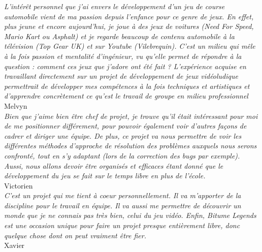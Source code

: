 \documentclass[11pt,a4paper]{article}
\begin{document}
  \textit{L'intérêt personnel que j'ai envers le développement d'un jeu de course automobile vient de ma 
    passion depuis l'enfance pour ce genre de jeux. En effet, plus jeune et encore aujourd'hui, je joue
    à des jeux de voitures (Need For Speed, Mario Kart ou Asphalt) et je regarde beaucoup de contenu automobile
    à la télévision (Top Gear UK) et sur Youtube (Vilebrequin). C'est un milieu qui mêle à la fois passion et 
    mentalité d'ingénieur, vu qu'elle permet de répondre à la question : comment ces jeux que j'adore ont été 
    fait ? L'expérience acquise en travaillant directement sur un projet de développement de jeux vidéoludique 
    permettrait de développer mes compétences à la fois techniques et artistiques et d'apprendre concrètement 
    ce qu'est le travail de groupe en milieu professionnel} \\
  \indent Melvyn\\

  \textit{Bien que j'aime bien être chef de projet, je trouve qu'il était intéressant 
    pour moi de me positionner différement, pour pouvoir également voir d'autres façons 
    de cadrer et diriger une équipe. De plus, ce projet va nous permettre de voir les différentes
    méthodes d'approche de résolution des problèmes auxquels nous serons confronté, tout en s'y
    adaptant (lors de la correction des bugs par exemple). Aussi, nous allons devoir être organisés
    et efficaces étant donné que le développement du jeu se fait sur le temps libre en plus de l'école.} \\
  \indent Victorien\\

  \textit{C'est un projet qui me tient à coeur personnellement. Il va m'apporter de la discipline pour le travail
    en équipe. Il va aussi me permettre de découvrir un monde que je ne connais pas très bien, celui du jeu vidéo.
    Enfin, Bitume Legends est une occasion unique pour faire un projet presque entièrement libre, donc quelque
    chose dont on peut vraiment être fier.}\\
  \indent Xavier
\clearpage
\end{document}
